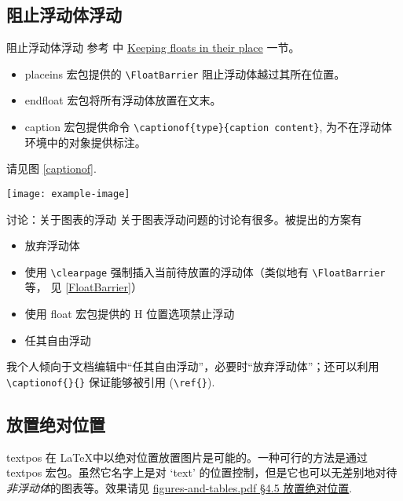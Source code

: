 \documentclass[final]{ctexbeamer}
\begin{document}
\subsection{阻止浮动体浮动}
% 
\begin{frame}[fragile]{阻止浮动体浮动}
参考 \cite{wiki:floats} 中 \href{https://en.wikibooks.org/wiki/LaTeX/Floats,\_Figures\_and\_Captions\#Keeping\_floats\_in\_their\_place}{Keeping floats in their place} 一节。
\begin{itemize}
  \item\label{FloatBarrier} placeins 宏包提供的 \verb+\FloatBarrier+ 阻止浮动体越过其所在位置。
  \item\label{endfloat} endfloat 宏包将所有浮动体放置在文末。
  \item caption 宏包提供命令 \verb+\captionof{type}{caption content}+, 为不在浮动体环境中的对象提供标注。
\end{itemize}
\begin{sidelst}
请见图 \ref{captionof}.

\texttt{[image: example-image]}
\label{captionof}
\end{sidelst}
\end{frame}


\begin{frame}[fragile]{讨论：关于图表的浮动}
关于图表浮动问题的讨论有很多。被提出的方案有
\begin{itemize}
  \item 放弃浮动体
  \item 使用 \verb+\clearpage+ 强制插入当前待放置的浮动体（类似地有 \verb+\FloatBarrier+ 等， 见 \ref{FloatBarrier}）
  \item 使用 float 宏包提供的 H 位置选项禁止浮动
  \item 任其自由浮动
\end{itemize}
我个人倾向于文档编辑中“任其自由浮动”，必要时“放弃浮动体”；还可以利用 \verb+\captionof{}{}+ 保证能够被引用 (\verb+\ref{}+).
\end{frame}


\subsection{放置绝对位置}
\begin{frame}[fragile]{textpos}
在 \LaTeX 中以绝对位置放置图片是可能的。一种可行的方法是通过 textpos 宏包。虽然它名字上是对 `text' 的位置控制，但是它也可以无差别地对待\emph{非浮动体}的图表等。效果请见 \href{run:figures-and-tables.pdf#page.20}{figures-and-tables.pdf \S 4.5 放置绝对位置}.
\end{frame}
\end{document}
